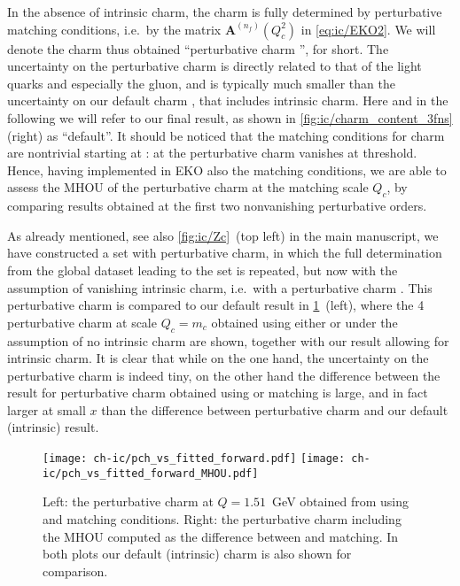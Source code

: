 
In the absence of intrinsic charm, the charm \pdf is fully determined by
perturbative matching conditions, i.e.\ by the matrix
$\mathbf{A}^{(n_f)}(Q_{c}^2)$ in \cref{eq:ic/EKO2}.
%
We will denote the
charm \pdf thus obtained
``perturbative charm \pdf'', for short. The \pdf
uncertainty on the perturbative charm \pdf is directly related to that 
of the light quarks and especially the gluon, and is typically much smaller
than  the  uncertainty on our default charm \pdf, that includes
intrinsic charm. Here and in the following we will refer to our final
result, as shown in \cref{fig:ic/charm_content_3fns} (right) as ``default''.
%
It should be noticed that the matching conditions for charm are 
nontrivial starting
at \nnlo: at \nlo the perturbative charm \pdf vanishes at threshold.
%
Hence, having implemented in EKO also the \nnnlo matching conditions,
we are able to assess the MHOU of the perturbative charm at the
matching scale $Q_c$, by comparing
results obtained at the first two nonvanishing perturbative
orders.

As already mentioned, see also \cref{fig:ic/Zc}~(top left) in the main manuscript, we have
constructed a \pdf set with perturbative charm, in which the full \pdf
determination from the global dataset leading to the  \pdf set
is repeated, but now with the assumption of vanishing intrinsic charm,
i.e.\ with a perturbative charm \pdf.
%
This perturbative charm \pdf is compared to our default result
in \cref{fig:ic/charm_fitted_vs_perturbative_mhous}~(left), where the 4\fns
perturbative 
charm \pdf at scale  $Q_c=m_c$ obtained using either \nnlo or \nnnlo
under the assumption of no intrinsic charm are shown, together with
our  result allowing for intrinsic charm.
%
It is clear that while on the one hand, the \pdf uncertainty on the
perturbative charm \pdf is indeed tiny, on the other
hand the difference between the result for perturbative charm
obtained using \nnlo or \nnnlo matching is large, and in
fact larger at small $x$ than the difference between perturbative charm and our
default (intrinsic) result.

\begin{figure}[h]
  \begin{center}
    \texttt{[image: ch-ic/pch\_vs\_fitted\_forward.pdf]}
    \texttt{[image: ch-ic/pch\_vs\_fitted\_forward\_MHOU.pdf]}
    \caption{\small Left: the perturbative charm \pdf at $Q=1.51$~GeV
  obtained from \nnlo \pdfs using \nnlo and \nnnlo matching
    conditions.
      Right: the \nnlo perturbative charm \pdf including the MHOU
    computed as the difference between \nnlo and \nnnlo matching.
In both plots our default (intrinsic) charm \pdf is also shown for comparison.  
  \label{fig:ic/charm_fitted_vs_perturbative_mhous} }
\end{center}
\end{figure}


